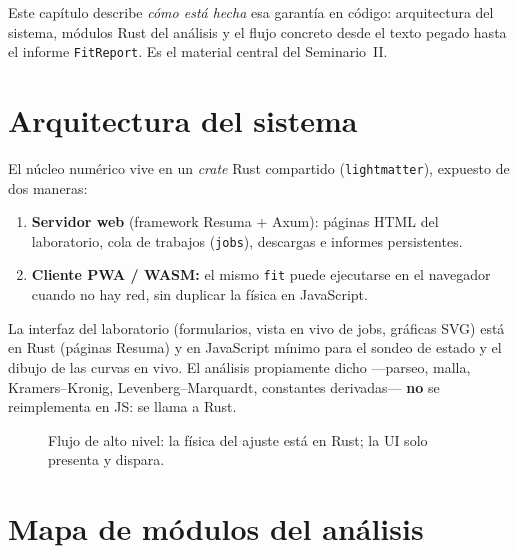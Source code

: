Este cap\'itulo describe \emph{c\'omo est\'a hecha} esa garant\'ia en c\'odigo: arquitectura del sistema, m\'odulos Rust del an\'alisis y el flujo concreto desde el texto pegado hasta el informe \texttt{FitReport}. Es el material central del Seminario~II.

\section{Arquitectura del sistema}

El n\'ucleo num\'erico vive en un \emph{crate} Rust compartido (\texttt{lightmatter}), expuesto de dos maneras:

\begin{enumerate}[leftmargin=*]
\item \textbf{Servidor web} (framework Resuma + Axum): p\'aginas HTML del laboratorio, cola de trabajos (\texttt{jobs}), descargas e informes persistentes.
\item \textbf{Cliente PWA / WASM:} el mismo \texttt{fit} puede ejecutarse en el navegador cuando no hay red, sin duplicar la f\'isica en JavaScript.
\end{enumerate}

La interfaz del laboratorio (formularios, vista en vivo de jobs, gr\'aficas SVG) est\'a en Rust (p\'aginas Resuma) y en JavaScript m\'inimo para el sondeo de estado y el dibujo de las curvas en vivo.
El an\'alisis propiamente dicho ---parseo, malla, Kramers--Kronig, Levenberg--Marquardt, constantes derivadas--- \textbf{no} se reimplementa en JS: se llama a Rust.

\begin{figure}[H]
\centering
{}
\caption{Flujo de alto nivel: la f\'isica del ajuste est\'a en Rust; la UI solo presenta y dispara.}
\label{fig:arch-flujo}
\end{figure}

\section{Mapa de m\'odulos del an\'alisis}


